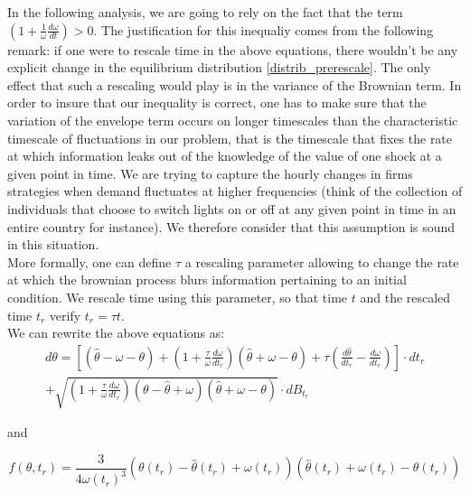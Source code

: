 In the following analysis, we are going to rely on the fact that the term $\left(1+\frac{1}{\omega}\frac{d\omega}{dt}\right)>0$. The justification for this inequaliy comes from the following remark: if one were to rescale time in the above equations, there wouldn't be any explicit change in the equilibrium distribution \ref{distrib_prerescale}. The only effect that such a rescaling would play is in the variance of the Brownian term. In order to insure that our inequality is correct, one has to make sure that the variation of the envelope term occurs on longer timescales than the characteristic timescale of fluctuations in our problem, that is the timescale that fixes the rate at which information leaks out of the knowledge of the value of one shock at a given point in time. We are trying to capture the hourly changes in firms strategies when demand fluctuates at higher frequencies (think of the collection of individuals that choose to switch lights on or off at any given point in time in an entire country for instance). We therefore consider that this assumption is sound in this situation.\\

More formally, one can define $\tau$ a rescaling parameter allowing to change the rate at which the brownian process blurs information pertaining to an initial condition. We rescale time using this parameter, so that time $t$ and the rescaled time $t_r$ verify $t_r=\tau t$. \\

We can rewrite the above equations as:
\begin{equation}
\begin{split}
  d\theta=\left[(\hat{\theta}-\omega-\theta)+\left(1+\frac{\tau}{\omega}\frac{d\omega}{dt_r}\right)(\hat{\theta}+\omega-\theta)+\tau\left(\frac{d\hat{\theta}}{dt_r}-\frac{d\omega}{dt_r}\right)\right]\cdot dt_r\\+\sqrt{\left(1+\frac{\tau}{\omega}\frac{d\omega}{dt_r}\right)(\theta-\hat{\theta}+\omega)(\hat{\theta}+\omega-\theta)}\cdot dB_{t_r}
\end{split}
\end{equation}

and 

\begin{equation}
f(\theta,t_r)=\frac{3}{4\omega(t_r)^3}(\theta(t_r)-\hat{\theta}(t_r)+\omega(t_r))(\hat{\theta}(t_r)+\omega(t_r)-\theta(t_r))
\label{distrib_postrescale}
\end{equation}

